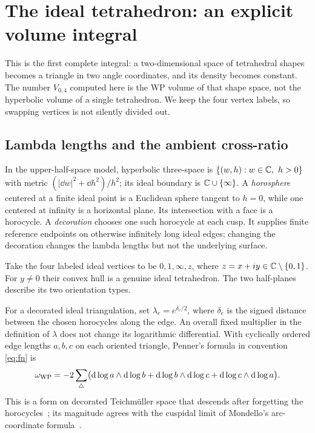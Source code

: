 \section{The ideal tetrahedron: an explicit volume integral}
\label{sec:tetrahedron}

This is the first complete integral: a two-dimensional space of
tetrahedral shapes becomes a triangle in two angle coordinates,
and its density becomes constant. The number $V_{0,4}$ computed
here is the WP volume of that shape space, not the hyperbolic volume
of a single tetrahedron. We keep the four vertex labels, so swapping
vertices is not silently divided out.

\subsection{Lambda lengths and the ambient cross-ratio}

In the upper-half-space model, hyperbolic three-space is
$\{(w,h):w\in\mathbb C,\ h>0\}$ with metric
$(|\dd w|^2+\dd h^2)/h^2$; its ideal boundary is
$\mathbb C\cup\{\infty\}$. A \emph{horosphere} centered at a finite
ideal point is a Euclidean sphere tangent to $h=0$, while one
centered at infinity is a horizontal plane. Its intersection with
a face is a horocycle. A \emph{decoration} chooses one such
horocycle at each cusp. It supplies finite reference endpoints
on otherwise infinitely long ideal edges; changing the decoration
changes the lambda lengths but not the underlying surface.

Take the four labeled ideal vertices to be $0,1,\infty,z$, where
$z=x+iy\in\mathbb C\setminus\{0,1\}$. For $y\ne0$ their convex hull is a genuine
ideal tetrahedron. The two half-planes describe its two orientation types.

For a decorated ideal triangulation, set $\lambda_e=e^{\delta_e/2}$, where
$\delta_e$ is the signed distance between the chosen horocycles along the
edge. An overall fixed multiplier in the definition of $\lambda$ does not
change its logarithmic differential. With cyclically ordered edge lengths
$a,b,c$ on each oriented triangle, Penner's formula in convention
\eqref{eq:fn} is
\begin{equation}
 \omega_{\mathrm{WP}}=-2\sum_{\triangle}
 \bigl(\mathop{}\!\mathrm d\log a\wedge\mathop{}\!\mathrm d\log b+
       \mathop{}\!\mathrm d\log b\wedge\mathop{}\!\mathrm d\log c+
       \mathop{}\!\mathrm d\log c\wedge\mathop{}\!\mathrm d\log a\bigr).
 \label{eq:penner}
\end{equation}
This is a form on decorated Teichm\"uller space that descends after forgetting
the horocycles~\cite{Penner}; its magnitude agrees with the cuspidal limit
of Mondello's arc-coordinate formula~\cite{MondelloBoundary}.

